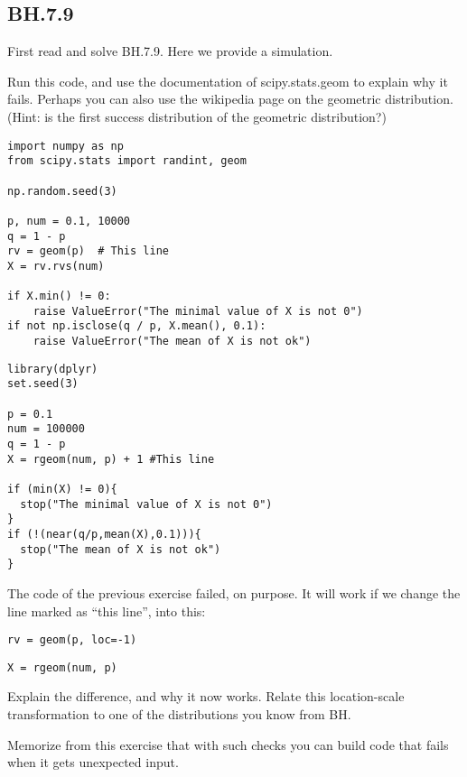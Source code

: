 \subsection{BH.7.9}
\label{sec:bh.7.9}

First read and solve BH.7.9. Here we provide a simulation.

\begin{exercise}
Run this code, and use the documentation of scipy.stats.geom to explain why it fails. Perhaps you can also use the wikipedia page on the geometric distribution. (Hint: is the first success distribution of the geometric distribution?)
\begin{verbatim}
import numpy as np
from scipy.stats import randint, geom

np.random.seed(3)

p, num = 0.1, 10000
q = 1 - p
rv = geom(p)  # This line
X = rv.rvs(num)

if X.min() != 0:
    raise ValueError("The minimal value of X is not 0")
if not np.isclose(q / p, X.mean(), 0.1):
    raise ValueError("The mean of X is not ok")
\end{verbatim}


\begin{verbatim}
library(dplyr)
set.seed(3)

p = 0.1
num = 100000
q = 1 - p
X = rgeom(num, p) + 1 #This line 

if (min(X) != 0){
  stop("The minimal value of X is not 0")
}
if (!(near(q/p,mean(X),0.1))){
  stop("The mean of X is not ok")
}
\end{verbatim}
\end{exercise}

\begin{exercise}
The code of the previous exercise failed, on purpose.   It will work if we change the line marked as ``this line'', into this:
\begin{verbatim}
rv = geom(p, loc=-1)
\end{verbatim}

\begin{verbatim}
X = rgeom(num, p)
\end{verbatim}
Explain the difference, and why it now works. Relate this location-scale transformation to one of the distributions you know from BH.
\end{exercise}

Memorize from this exercise that with such checks you can build code that fails when it gets unexpected input.


